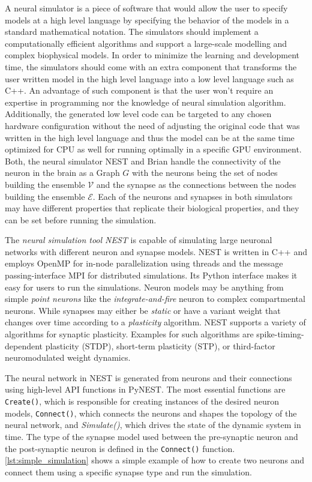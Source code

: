 A neural simulator is a piece of software that would allow the user to specify models at a high level language by specifying the behavior of the models in a standard mathematical notation. The simulators should implement a computationally efficient algorithms and support a large-scale modelling and complex biophysical models. In order to minimize the learning and development time, the simulators should come with an extra component that transforms the user written model in the high level language into a low level language such as C++. An advantage of such component is that the user won't require an expertise in programming nor the knowledge of neural simulation algorithm. Additionally, the generated low level code can be targeted to any chosen hardware configuration without the need of adjusting the original code that was written in the high level language and thus the model can be at the same time optimized for CPU as well for running optimally in a specific GPU environment. Both, the neural simulator NEST \citep{gewaltig2007nest} and Brian \citep{10.3389/neuro.11.005.2008} handle the connectivity of the neuron in the brain as a Graph $G$ \citep{bondy1976graph} with the neurons being the set of nodes building the ensemble $ \mathcal{V}$ and the synapse as the connections between the nodes building the ensemble $ \mathcal{E}$. Each of the neurons and synapses in both simulators may have different properties that replicate their biological properties, and they can be set before running the simulation.

The \emph{neural simulation tool NEST} \citep{gewaltig2007nest, spreizer_sebastian_2022_6368024} is capable of simulating large neuronal networks with different neuron and synapse models. NEST is written in C++ and employs OpenMP for in-node parallelization using threads and the message passing-interface MPI \citep{clarke1994mpi} for distributed simulations. Its Python interface \citep[\emph{PyNEST};][]{10.3389/neuro.11.012.2008} makes it easy for users to run the simulations. Neuron models may be anything from simple \emph{point neurons} like the \emph{integrate-and-fire} neuron to complex compartmental neurons. While synapses may either be \emph{static} or have a variant weight that changes over time according to a \emph{plasticity} algorithm. NEST supports a variety of algorithms for synaptic plasticity. Examples for such algorithms are spike-timing-dependent plasticity (STDP), short-term plasticity (STP), or third-factor neuromodulated weight dynamics.

The neural network in NEST is generated from neurons and their connections using high-level API functions in PyNEST. The most essential functions are \texttt{Create()}, which is responsible for creating instances of the desired neuron models, \texttt{Connect()}, which connects the neurons and shapes the topology of the neural network, and \emph{Simulate()}, which drives the state of the dynamic system in time. The type of the synapse model used between the pre-synaptic neuron and the post-synaptic neuron is defined in the \texttt{Connect()} function. \autoref{lst:simple_simulation} shows a simple example of how to create two neurons and connect them using a specific synapse type and run the simulation.\\

